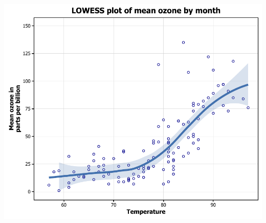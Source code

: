 \documentclass[]{article}
\begin{document}
\begin{center}\includegraphics{12_Lowess_Plots_pdf/lowess_21-1} \end{center}
\end{document}
